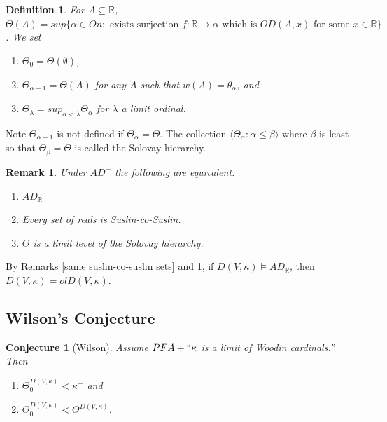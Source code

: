 \documentclass[12pt]{article}
\newtheorem{definition}[theorem]{Definition}
\newtheorem{conjecture}[theorem]{Conjecture}
\newtheorem{remark}[theorem]{Remark}
\newcommand\R{\mathbb{R}}
\begin{document}
\begin{definition}
    For $A\subseteq \R$, $\Theta(A) = sup\{\alpha\in On : \text{ exists surjection } f:\R\to \alpha \text{ which is } OD(A,x) \text{ for some } x\in\R\}$. We set
    \begin{enumerate}
        \item $\Theta_0 = \Theta(\emptyset)$,
        \item $\Theta_{\alpha+1} = \Theta(A)$ for any $A$ such that $w(A) = \theta_\alpha$, and
        \item $\Theta_\lambda = sup_{\alpha < \lambda} \Theta_\alpha$ for $\lambda$ a limit ordinal.
    \end{enumerate}
\end{definition}

Note $\Theta_{\alpha+1}$ is not defined if $\Theta_\alpha = \Theta$. The collection $\langle \Theta_\alpha : \alpha \leq \beta\rangle$ where $\beta$ is least so that $\Theta_\beta = \Theta$ is called the Solovay hierarchy.

\begin{remark}
\label{AD_R equivalences}
    Under $AD^+$ the following are equivalent:
    \begin{enumerate}
        \item $AD_\R$
        \item Every set of reals is Suslin-co-Suslin.
        \item $\Theta$ is a limit level of the Solovay hierarchy.
    \end{enumerate}
\end{remark}

By Remarks \ref{same suslin-co-suslin sets} and \ref{AD_R equivalences}, if $D(V,\kappa) \models AD_\R$, then $D(V,\kappa) = olD(V,\kappa)$.

\subsection{Wilson's Conjecture}

\begin{conjecture}[Wilson]
\label{trevor conjecture}
Assume $PFA + ``\kappa$ is a limit of Woodin cardinals.'' Then
\begin{enumerate}
    \item \label{1st conjecture} $\Theta_0^{D(V,\kappa)} < \kappa^+$ and
    \item \label{2nd conjecture} $\Theta_0^{D(V,\kappa)} < \Theta^{D(V,\kappa)}$.
\end{enumerate}
\end{conjecture}
\end{document}
